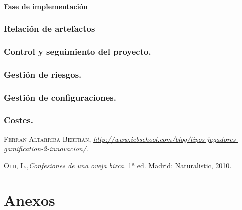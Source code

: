 \documentclass[twoside]{report}
\begin{document}
\subsubsection{Fase de implementación}
\subsection{Relación de artefactos}
\subsection{Control y seguimiento del proyecto.}
\subsection{Gestión de riesgos.}
\subsection{Gestión de configuraciones.}
\subsection{Costes.}
\lipsum[1-900]
\begin{thebibliography}{a}
 \textsc{Ferran Altarriba Bertran}, \textit{\url{http://www.iebschool.com/blog/tipos-jugadores-gamification-2-innovacion/}}.  

 \textsc{Old, L.},\textit{Confesiones de una oveja bizca.} 1ª ed. Madrid: Naturalistic, 2010. 
\end{thebibliography}

\chapter{Anexos}
\end{document}
